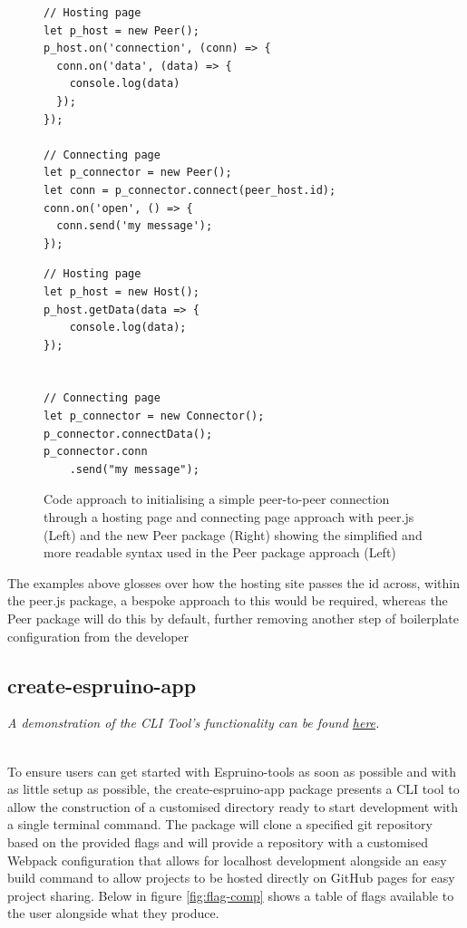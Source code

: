 \documentclass{l4proj}
\begin{document}
\begin{figure}[!ht]
\centering
\begin{minipage}{7cm}
  \centering
  \begin{lstlisting}
// Hosting page
let p_host = new Peer();
p_host.on('connection', (conn) => {
  conn.on('data', (data) => {
    console.log(data)
  });
});

// Connecting page
let p_connector = new Peer();
let conn = p_connector.connect(peer_host.id);
conn.on('open', () => {
  conn.send('my message');
});
  \end{lstlisting}
\end{minipage}
\hspace{1cm}
\begin{minipage}{5.5cm}
  \centering
  
  \begin{lstlisting}
// Hosting page
let p_host = new Host();
p_host.getData(data => {
    console.log(data);
});
 

// Connecting page
let p_connector = new Connector();
p_connector.connectData();
p_connector.conn
    .send("my message");

  \end{lstlisting}

\end{minipage}
  \caption{Code approach to initialising a simple peer-to-peer connection through a hosting page and connecting page approach with peer.js (Left) and the new Peer package (Right) showing the simplified and more readable syntax used in the Peer package approach (Left)}
  \label{fig:peer-syntax}
\end{figure}

The examples above glosses over how the hosting site passes the id across, within the peer.js package, a bespoke approach to this would be required, whereas the Peer package will do this by default, further removing another step of boilerplate configuration from the developer


\subsection{create-espruino-app}
\begin{center}
    
\textit{A demonstration of the CLI Tool's functionality can be found \href{https://demos-mu.vercel.app/demo/create-espruino-app}{here}.}
\end{center}
\\
To ensure users can get started with Espruino-tools as soon as possible and with as little setup as possible, the create-espruino-app package presents a CLI tool to allow the construction of a customised directory ready to start development with a single terminal command. The package will clone a specified git repository based on the provided flags and will provide a repository with a customised Webpack configuration that allows for localhost development alongside an easy build command to allow projects to be hosted directly on GitHub pages for easy project sharing. Below in figure \ref{fig:flag-comp} shows a table of flags available to the user alongside what they produce.
\end{document}
